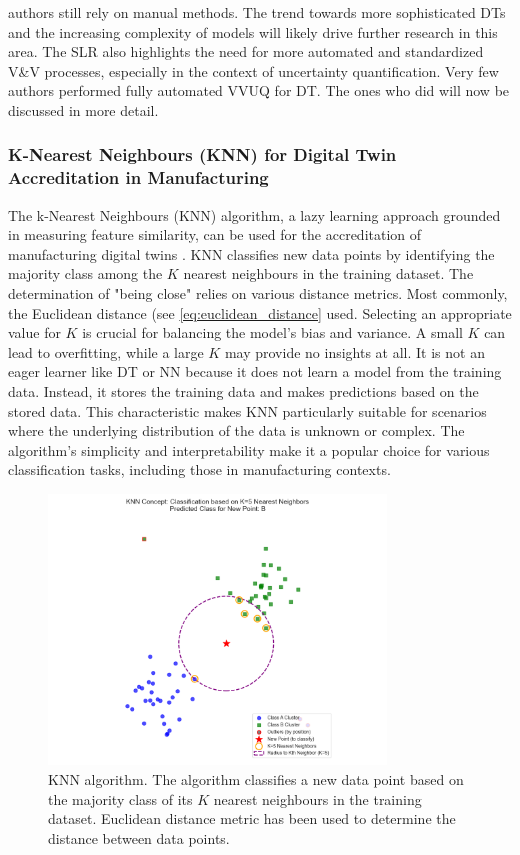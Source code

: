 authors still rely on manual methods. The trend towards more sophisticated DTs and the increasing complexity of models will likely drive further research in this area. The SLR also highlights the need for more automated and standardized V&V processes, especially in the context of uncertainty quantification. Very few authors performed fully automated VVUQ for DT. The ones who did will now be discussed in more detail.


\subsubsection*{K-Nearest Neighbours (KNN) for Digital Twin Accreditation in Manufacturing}
\label{sec:knn}
The k-Nearest Neighbours (KNN) algorithm, a lazy learning approach grounded in measuring feature similarity, can be used for the accreditation of manufacturing digital twins \autocite{dos2024simulation}. KNN classifies new data points by identifying the majority class among the $K$ nearest neighbours in the training dataset. The determination of "being close" relies on various distance metrics. Most commonly, the Euclidean distance (see \autoref{eq:euclidean_distance} used. Selecting an appropriate value for $K$ is crucial for balancing the model's bias and variance. A small $K$ can lead to overfitting, while a large $K$ may provide no insights at all. It is not an eager learner like DT or NN because it does not learn a model from the training data. Instead, it stores the training data and makes predictions based on the stored data. This characteristic makes KNN particularly suitable for scenarios where the underlying distribution of the data is unknown or complex. The algorithm's simplicity and interpretability make it a popular choice for various classification tasks, including those in manufacturing contexts.

\begin{figure}[htbp]
  \centering
  \includegraphics[width=0.8\textwidth]{figures/knn.png}
  \caption{KNN algorithm. The algorithm classifies a new data point based on the majority class of its $K$ nearest neighbours in the training dataset. Euclidean distance metric has been used to determine the distance between data points.}
  \label{fig:knn}
\end{figure}

